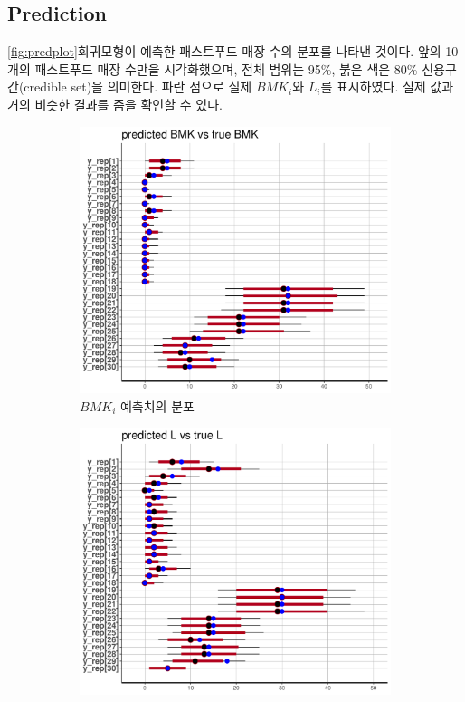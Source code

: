 \documentclass{scrartcl}
\begin{document}
\subsection{Prediction}

\autoref{fig:predplot}\은 회귀모형이 예측한 패스트푸드 매장 수의 분포를 나타낸 것이다. 앞의 10개의 패스트푸드 매장 수만을 시각화했으며, 전체 범위는 95\%, 붉은 색은 80\% 신용구간(credible set)을 의미한다. 파란 점으로 실제 $BMK_i$와 $L_i$를 표시하였다. 실제 값과 거의 비슷한 결과를 줌을 확인할 수 있다.
\begin{figure}[!ht]
    \centering
    \begin{subfigure}[b]{0.45\textwidth}
        \centering
        \includegraphics[width=\textwidth]{../figs/mcmc/bmk_pred.pdf}
        \caption{$BMK_i$ 예측치의 분포}\label{fig:predplot:bmk}
    \end{subfigure}
    \hfill
    \begin{subfigure}[b]{0.45\textwidth}   
        \centering 
        \includegraphics[width=\textwidth]{../figs/mcmc/l_pred.pdf}

\end{subfigure}
\end{figure}
\end{document}
